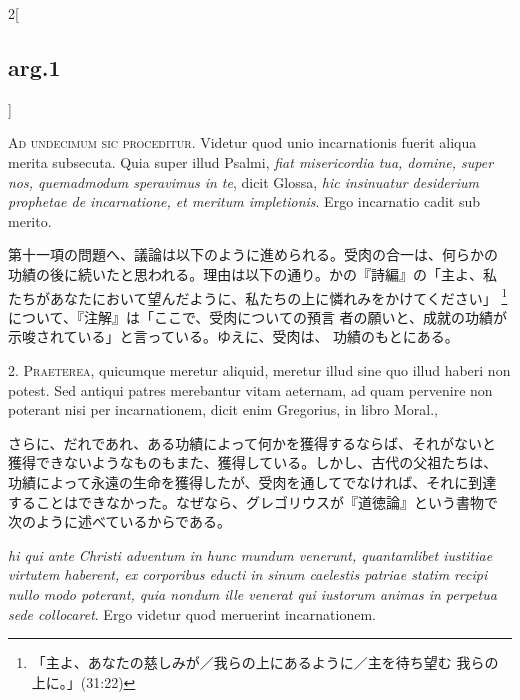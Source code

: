 \documentclass[paper=a4paper,fontsize=10pt,jafontsize=9pt,titlepage]{jlreq}
\begin{document}
\begin{paracol}{2}[\subsection{arg.1}]

{\Huge A}{\scshape d undecimum sic proceditur}. Videtur quod unio
incarnationis fuerit aliqua merita subsecuta. Quia super illud Psalmi,
{\itshape fiat misericordia tua, domine, super nos, quemadmodum
speravimus in te}, dicit Glossa, {\itshape hic insinuatur desiderium
prophetae de incarnatione, et meritum impletionis}. Ergo incarnatio
cadit sub merito.

\switchcolumn

第十一項の問題へ、議論は以下のように進められる。受肉の合一は、何らかの
功績の後に続いたと思われる。理由は以下の通り。かの『詩編』の「主よ、私
たちがあなたにおいて望んだように、私たちの上に憐れみをかけてください」
\footnote{「主よ、あなたの慈しみが／我らの上にあるように／主を待ち望む
我らの上に。」(31:22)}について、『注解』は「ここで、受肉についての預言
者の願いと、成就の功績が示唆されている」と言っている。ゆえに、受肉は、
功績のもとにある。


2. {\scshape Praeterea}, quicumque meretur aliquid, meretur illud sine
quo illud haberi non potest. Sed antiqui patres merebantur vitam
aeternam, ad quam pervenire non poterant nisi per incarnationem, dicit
enim Gregorius, in libro Moral.,

\switchcolumn

さらに、だれであれ、ある功績によって何かを獲得するならば、それがないと
獲得できないようなものもまた、獲得している。しかし、古代の父祖たちは、
功績によって永遠の生命を獲得したが、受肉を通してでなければ、それに到達
することはできなかった。なぜなら、グレゴリウスが『道徳論』という書物で
次のように述べているからである。

\switchcolumn*

{\itshape hi qui ante Christi adventum in hunc mundum venerunt,
quantamlibet iustitiae virtutem haberent, ex corporibus educti in
sinum caelestis patriae statim recipi nullo modo poterant, quia nondum
ille venerat qui iustorum animas in perpetua sede collocaret}. Ergo
videtur quod meruerint incarnationem.

\switchcolumn


\end{paracol}
\end{document}
